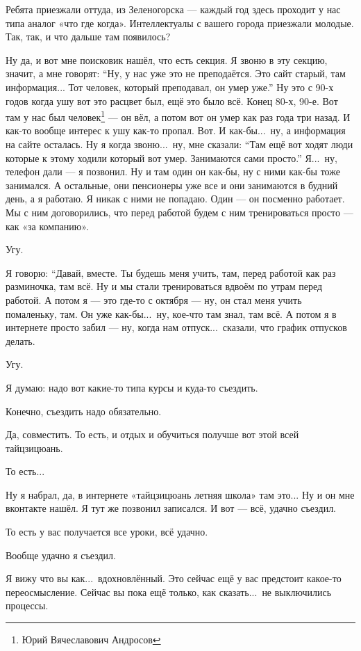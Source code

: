 \A
Ребята приезжали оттуда, из Зеленогорска --- каждый год здесь проходит у нас
типа аналог «что где когда». Интеллектуалы с вашего города приезжали молодые.
Так, так, и что дальше там появилось?

\I
Ну да, и вот мне поисковик нашёл, что есть секция. Я звоню в эту секцию, значит, а мне говорят:
``Ну, у нас уже это не преподаётся. Это сайт старый, там информация...
Тот человек, который преподавал, он умер уже.''
Ну это с 90-х годов когда ушу вот это расцвет был, ещё это было всё.
Конец 80-х, 90-е. Вот там у
нас был человек\footnote*{Юрий Вячеславович Андросов} --- он вёл, а потом вот он умер как раз года
три
назад. И как-то вообще интерес к ушу как-то пропал. Вот. И как-бы...\ ну, а информация на сайте
осталась.
Ну я когда звоню...\ ну, мне сказали: ``Там ещё вот ходят люди которые к этому ходили который
вот умер. Занимаются сами просто.''
Я...\ ну, телефон дали --- я позвонил. Ну и там один он как-бы, ну с ними как-бы тоже
занимался. А остальные, они пенсионеры уже все и они занимаются в будний день, а я работаю.
Я никак с ними не попадаю. Один --- он посменно работает. Мы с ним договорились, что перед
работой будем
с ним тренироваться просто --- как «за компанию».

\A
Угу.

\I
Я говорю: ``Давай, вместе. Ты будешь меня учить, там, перед работой как раз разминочка, там всё.
Ну и мы стали тренироваться вдвоём по утрам перед работой.
А потом я --- это где-то с октября --- ну, он стал меня учить помаленьку, там.
Он уже как-бы...\ ну, кое-что там знал, там всё.
А потом я в интернете просто забил --- ну, когда нам отпуск...\ сказали, что график отпусков
делать.

\A
Угу.

\I
Я думаю: надо вот какие-то типа курсы и куда-то съездить.

\A
Конечно, съездить надо обязательно.

\I
Да, совместить. То есть, и отдых и обучиться получше вот этой всей тайцзицюань.

\A
То есть...

\I
Ну я набрал, да, в интернете «тайцзицюань летняя школа» там это...
Ну и он мне вконтакте нашёл. Я тут же позвонил записался. И вот --- всё, удачно съездил.

\A
То есть у вас получается все уроки, всё удачно.

\I
Вообще удачно я съездил.

\A
Я вижу что вы как...\ вдохновлённый.
Это сейчас ещё у вас предстоит какое-то переосмысление.
Сейчас вы пока ещё только, как сказать...\
не выключились процессы.

